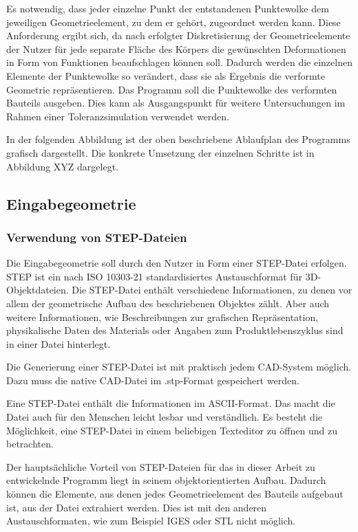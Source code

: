 Es notwendig, dass jeder einzelne Punkt der entstandenen Punktewolke dem jeweiligen Geometrieelement, zu dem er gehört, zugeordnet werden kann. Diese Anforderung ergibt sich, da nach erfolgter Diskretisierung der Geometrieelemente der Nutzer für jede separate Fläche des Körpers die gewünschten Deformationen in Form von Funktionen beaufschlagen können soll. Dadurch werden die einzelnen Elemente der Punktewolke so verändert, dass sie als Ergebnis die verformte Geometrie repräsentieren. 
Das Programm soll die Punktewolke des verformten Bauteils ausgeben. Dies kann als Ausgangspunkt für weitere Untersuchungen im Rahmen einer Toleranzsimulation verwendet werden. 

In der folgenden Abbildung ist der oben beschriebene Ablaufplan des Programms grafisch dargestellt. Die konkrete Umsetzung der einzelnen Schritte ist in Abbildung XYZ dargelegt.        
 
\subsection{Eingabegeometrie} 
\label{sec:eingabegeometrie}

\subsubsection{Verwendung von STEP-Dateien}
 
Die Eingabegeometrie soll durch den Nutzer in Form einer STEP-Datei erfolgen. STEP ist ein nach ISO 10303-21 standardisiertes Austauschformat für 3D-Objektdateien. Die STEP-Datei enthält verschiedene Informationen, zu denen vor allem der geometrische Aufbau des beschriebenen Objektes zählt. Aber auch weitere Informationen, wie Beschreibungen zur grafischen Repräsentation, physikalische Daten des Materials oder Angaben zum Produktlebenszyklus sind in einer Datei hinterlegt. 

Die Generierung einer STEP-Datei ist mit praktisch jedem CAD-System möglich. Dazu muss die native CAD-Datei im .stp-Format gespeichert werden.

Eine STEP-Datei enthält die Informationen im ASCII-Format. Das macht die Datei auch für den Menschen leicht lesbar und verständlich. Es besteht die Möglichkeit, eine STEP-Datei in einem beliebigen Texteditor zu öffnen und zu betrachten. 

Der hauptsächliche Vorteil von STEP-Dateien für das in dieser Arbeit zu entwickelnde Programm liegt in seinem objektorientierten Aufbau. Dadurch können die Elemente, aus denen jedes Geometrieelement des Bauteils aufgebaut ist, aus der Datei extrahiert werden. Dies ist mit den anderen Austauschformaten, wie zum Beispiel IGES oder STL nicht möglich. 

